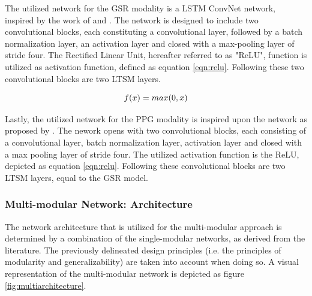 \documentclass[12pt]{article}
\begin{document}
The utilized network for the GSR modality is a LSTM ConvNet network, inspired by the work of  and  . The network is designed to include two convolutional blocks, each constituting a convolutional layer, followed by a batch normalization layer, an activation layer and closed with a max-pooling layer of stride four. The Rectified Linear Unit, hereafter referred to as "ReLU", function is utilized as activation function, defined as equation \ref{eqn:relu}. Following these two convolutional blocks are two LTSM layers.

\begin{equation} 
\label{eqn:relu}
f(x)=max(0,x)
\bigskip
\end{equation}

Lastly, the utilized network for the PPG modality is inspired upon the network as proposed by . The nework opens with two convolutional blocks, each consisting of a convolutional layer, batch normalization layer, activation layer and closed with a max pooling layer of stride four. The utilized activation function is the ReLU, depicted as equation \ref{eqn:relu}. Following these convolutional blocks are two LTSM layers, equal to the GSR model. 

\subsubsection{Multi-modular Network: Architecture}
The network architecture that is utilized for the multi-modular approach is determined by a combination of the single-modular networks, as derived from the literature. The previously delineated design principles (i.e. the principles of modularity and generalizability) are taken into account when doing so. A visual representation of the multi-modular network is depicted as figure \ref{fig:multiarchitecture}.
\end{document}
